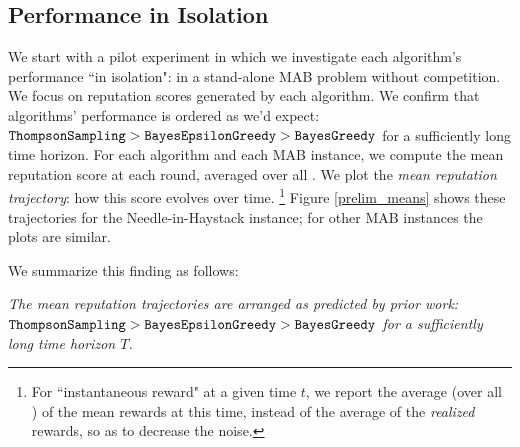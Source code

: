 \documentclass[../competing_bandits.tex]{subfiles}
\begin{document}
\subsection{Performance in Isolation}\label{sec:isolation}

We start with a pilot experiment in which we investigate each algorithm's performance ``in isolation": in a stand-alone MAB problem without competition. We focus on reputation scores generated by each algorithm. We confirm that algorithms' performance is ordered as we'd expect:
    $\mathtt{ThompsonSampling} > \mathtt{BayesEpsilonGreedy} > \mathtt{BayesGreedy}$
for a sufficiently long time horizon. For each algorithm and each MAB instance, we compute the mean reputation score at each round, averaged over all \MRVs. We plot the \emph{mean reputation trajectory}: how this score evolves over time. %
\footnote{For ``instantaneous reward" at a given time $t$, we report the average (over all \MRVs) of the mean rewards at this time, instead of the average of the \emph{realized} rewards, so as to decrease the noise.}
Figure \ref{prelim_means} shows these trajectories for the Needle-in-Haystack instance; for other MAB instances the plots are similar.

We summarize this finding as follows:

\begin{finding}
\textit{The mean reputation trajectories  are arranged as predicted by prior work:
    $\mathtt{ThompsonSampling} > \mathtt{BayesEpsilonGreedy} > \mathtt{BayesGreedy}$ for a sufficiently long time horizon $T$.}
\end{finding}
\end{document}
